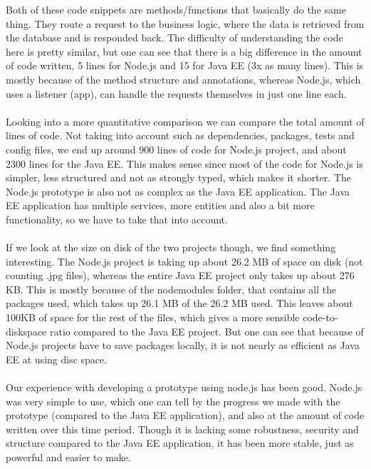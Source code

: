 Both of these code snippets are methods/functions that basically do the same thing. They route a request to the business logic, where the data is retrieved from the database and is responded back. The difficulty of understanding the code here is pretty similar, but one can see that there is a big difference in the amount of code written, 5 lines for Node.js and 15 for Java EE (3x as many lines). This is mostly because of the method structure and annotations, whereas Node.js, which uses a listener (app), can handle the requests themselves in just one line each.
\\\\
Looking into a more quantitative comparison we can compare the total amount of lines of code.  Not taking into account such as dependencies, packages, tests and config files, we end up around 900 lines of code for Node.js project, and about 2300 lines for the Java EE. This makes sense since most of the code for Node.js is simpler, less structured and not as strongly typed, which makes it shorter. The Node.js prototype is also not as complex as the Java EE application. The Java EE application has multiple services, more entities and also a bit more functionality, so we have to take that into account. 
\\\\
If we look at the size on disk of the two projects though, we find something interesting. The Node.js project is taking up about 26.2 MB of space on disk (not counting .jpg files), whereas the entire Java EE project only takes up about 276 KB. This is mostly because of the nodemodules folder, that contains all the packages used, which takes up 26.1 MB of the 26.2 MB used. This leaves about 100KB of space for the rest of the files, which gives a more sensible code-to-diskspace ratio compared to the Java EE project. But one can see that because of Node.js projects have to save packages locally, it is not nearly as efficient as Java EE at using disc space.
\\\\
Our experience with developing a prototype using node.js has been good. Node.js was very simple to use, which one can tell by the progress we made with the prototype (compared to the Java EE application), and also at the amount of code written over this time period. Though it is lacking some robustness, security and structure compared to the Java EE application, it has been more stable, just as powerful and easier to make.